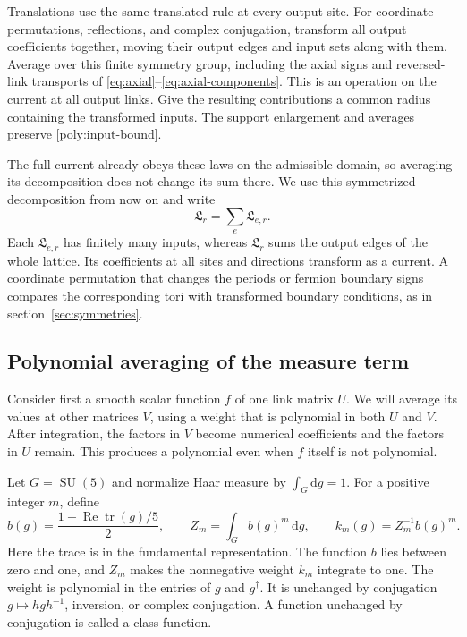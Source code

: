 \documentclass[11pt,a4paper]{article}
\theoremstyle{remark}
\DeclareMathOperator{\tr}{tr}
\DeclareMathOperator{\SU}{SU}
\newcommand{\dd}{\mathrm d}
\begin{document}
Translations use the same translated rule at every output site. For
coordinate permutations, reflections, and complex conjugation, transform
all output coefficients together, moving their output edges and input
sets along with them. Average over this finite symmetry group, including
the axial signs and reversed-link transports of
\eqref{eq:axial}--\eqref{eq:axial-components}. This is an operation
on the current at all output links. Give the resulting contributions
a common radius containing the transformed inputs. The support
enlargement and averages preserve \eqref{poly:input-bound}.

The full current already obeys these laws on the admissible domain, so
averaging its decomposition does not change its sum there. We use this
symmetrized decomposition from now on and write
\begin{equation}
 \mathfrak L_r=\sum_e\mathfrak L_{e,r}.
\end{equation}
Each $\mathfrak L_{e,r}$ has finitely many inputs, whereas
$\mathfrak L_r$ sums the output edges of the whole lattice. Its
coefficients at all sites and directions transform as a current. A
coordinate permutation that changes the periods or fermion boundary
signs compares the corresponding tori with transformed boundary
conditions, as in section~\ref{sec:symmetries}.

\subsection{Polynomial averaging of the measure term}

Consider first a smooth scalar function $f$ of one link matrix $U$.
We will average its values at other matrices $V$, using a weight that
is polynomial in both $U$ and $V$. After integration, the factors
in $V$ become numerical coefficients and the factors in $U$ remain.
This produces a polynomial even when $f$ itself is not polynomial.

Let $G=\SU(5)$ and normalize Haar measure by $\int_G\dd g=1$.
For a positive integer $m$, define
\begin{equation}
 b(g)=\frac{1+\operatorname{Re}\tr(g)/5}{2},\qquad
 Z_m=\int_Gb(g)^m\,\dd g,\qquad k_m(g)=Z_m^{-1}b(g)^m .
 \label{poly:kernel}
\end{equation}
Here the trace is in the fundamental representation. The function
$b$ lies between zero and one, and $Z_m$ makes the nonnegative weight
$k_m$ integrate to one. The weight is polynomial in the entries of
$g$ and $g^\dagger$. It is unchanged by conjugation
$g\mapsto hgh^{-1}$, inversion, or complex conjugation. A function
unchanged by conjugation is called a class function.
\end{document}
